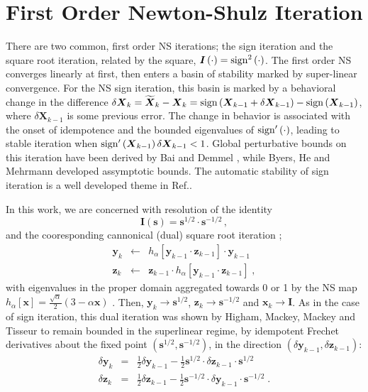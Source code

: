 \documentclass[letterpaper,twocolumn,amsmath,amsfont,amssymb,english,aps,jcp,preprintnumbers,groupaddress,nofootinbib,tightenlines]{revtex4}
\newcommand{\mat}[1]{\boldsymbol{#1}}
\begin{document}
\section{First Order Newton-Shulz Iteration}

There are two common, first order NS iterations; the sign iteration and the square root iteration, related by the square, $\mat{I}\left( \cdot \right)= {\rm sign}^2\left( \cdot \right) $.  The first order NS converges linearly at first, then enters a basin of stability marked by super-linear convergence.   
For the NS sign iteration, this basin is marked by a behavioral change in the
difference $\delta \mat{X}_k = \widetilde{\mat{X}}_k -\mat{X}_k = {\rm sign} \left(\mat{X}_{k-1}+\delta \mat{X}_{k-1} \right)
-{\rm sign} \left(\mat{X}_{k-1} \right)$, where $\delta \mat{X}_{k-1}$ is some previous error.
The change in behavior is associated with the onset of idempotence and the bounded eigenvalues of ${\rm sign}'\left( \cdot \right)$, leading to stable 
iteration when ${\rm sign}'\left( \mat{X}_{k-1} \right) \delta \mat{X}_{k-1} < 1 $.  
Global perturbative bounds on this iteration have been derived by Bai and Demmel \cite{Bai98usingthe}, while
Byers, He and Mehrmann \cite{} developed assymptotic bounds.  The automatic stability of sign iteration is a well developed theme in Ref.\cite{Higham08}.

In this work, we are concerned with  resolution of the identity \cite{}
\begin{equation}
\mat{I} \left( \mat{s} \right) =\mat{s}^{1/2} \cdot \mat{s}^{-1/2} \, ,
\end{equation}
and the cooresponding cannonical (dual) square root iteration \cite{};
\begin{eqnarray}
\mat{y}_k &\leftarrow& h_\alpha \left[ \mat{y}_{k-1} \cdot \mat{z}_{k-1} \right] \cdot \mat{y}_{k-1}  \\ 
\mat{z}_k &\leftarrow& \mat{z}_{k-1} \cdot h_\alpha \left[ \mat{y}_{k-1} \cdot \mat{z}_{k-1} \right] \; ,
\end{eqnarray}
with eigenvalues in the proper domain aggregated towards 0 or 1 by the 
NS map $h_\alpha[\mat{x}]=\frac{\sqrt{\alpha}}{2} \left(3-\alpha \mat{x} \right)$  \cite{}. Then,
${\mat{y}}_k \rightarrow \mat{s}^{1/2}$, ${\mat{z}}_k \rightarrow \mat{s}^{-1/2}$ and ${\mat{x}}_k \rightarrow {\mat{I}}$.
As in the case of sign iteration, this dual iteration was shown by Higham, Mackey,  Mackey and Tisseur \cite{Higham2005} 
to remain bounded in the superlinear regime, by idempotent Frechet derivatives about the fixed point $\left(\mat{s}^{1/2},\mat{s}^{-1/2}\right)$,
in the direction $\left( \delta \mat{y}_{k-1} , \delta \mat{z}_{k-1} \right)$:
\begin{eqnarray}
\delta \mat{y}_k &=& \frac{1}{2} \delta \mat{y}_{k-1} - \frac{1}{2} \mat{s}^{1/2} \cdot \delta \mat{z}_{k-1} \cdot \mat{s}^{1/2} \\
\delta \mat{z}_k &=& \frac{1}{2} \delta \mat{z}_{k-1} - \frac{1}{2} \mat{s}^{-1/2} \cdot \delta \mat{y}_{k-1} \cdot \mat{s}^{-1/2} \;.
\end{eqnarray}
\end{document}
